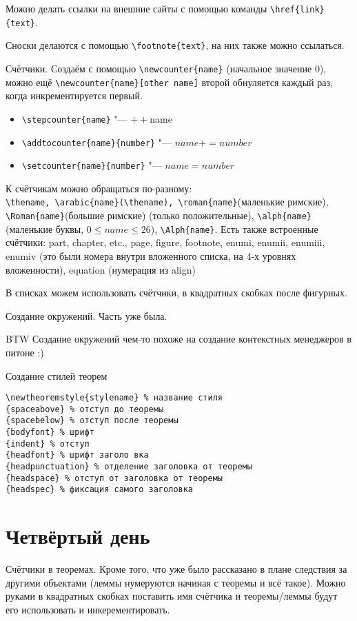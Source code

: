 \documentclass[a4paper, 12pt]{article}
\begin{document}
Можно делать ссылки на внешние сайты с помощью команды \verb|\href{link}{text}|.

Сноски делаются с помощью \verb|\footnote{text}|, на них также можно ссылаться.

Счётчики. Создаём с помощью \verb|\newcounter{name}| (начальное значение 0), можно ещё \verb|\newcounter{name}[other name]| второй обнуляется каждый раз, когда инкрементируется первый.
\begin{itemize}
	\item \verb|\stepcounter{name}| "--- $++$name
	\item \verb|\addtocounter{name}{number}| "--- $name+=number$
	\item \verb|\setcounter{name}{number}| "--- $name=number$
\end{itemize}
К счётчикам можно обращаться по-разному:\\
\verb|\thename, \arabic{name}(\thename), \roman{name}|(маленькие римские), \verb|\Roman{name}|(большие римские) (только положительные), \verb|\alph{name}| (маленькие буквы, $0\leq name\leq26$), \verb|\Alph{name}|. Есть также встроенные счётчики: part, chapter, etc., page, figure, footnote, enumi, enumii, enumiii, enumiv (это были номера внутри вложенного списка, на 4-х уровнях вложенности), equation (нумерация из align)

В списках можем использовать счётчики, в квадратных скобках после фигурных.

Создание окружений. Часть уже была.

BTW Создание окружений чем-то похоже на создание контекстных менеджеров в питоне :)

Создание стилей теорем
\begin{verbatim}
\newtheoremstyle{stylename} % название стиля
{spaceabove} % отступ до теоремы
{spacebelow} % отступ после теоремы
{bodyfont} % шрифт
{indent} % отступ
{headfont} % шрифт заголо вка
{headpunctuation} % отделение заголовка от теоремы
{headspace} % отступ от заголовка от теоремы
{headspec} % фиксация самого заголовка
\end{verbatim}

\section{Четвёртый день}

Счётчики в теоремах. Кроме того, что уже было рассказано в плане следствия за другими объектами (леммы нумеруются начиная с теоремы и всё такое). Можно руками в квадратных скобках поставить имя счётчика и теоремы/леммы будут его использовать и инкерементировать.
\end{document}
